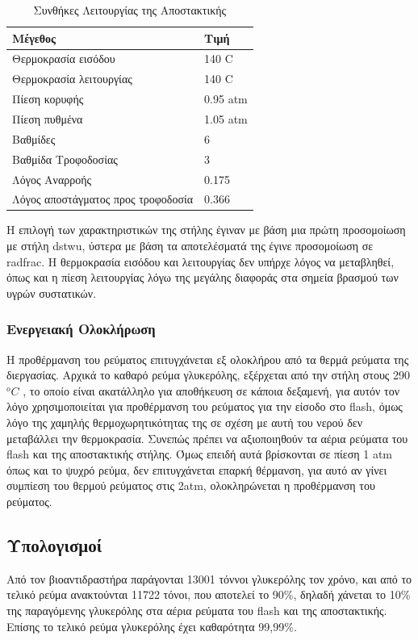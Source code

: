 \documentclass[11pt]{article}
\begin{document}
\begin{table}[htbp]
\caption{Συνθήκες Λειτουργίας της Αποστακτικής}
\centering
\begin{tabular}{ll}
Μέγεθος & Τιμή\\
\hline
Θερμοκρασία εισόδου & 140 C\\
Θερμοκρασία λειτουργίας & 140 C\\
Πίεση κορυφής & 0.95 atm\\
Πίεση πυθμένα & 1.05 atm\\
Βαθμίδες & 6\\
Βαθμίδα Τροφοδοσίας & 3\\
Λόγος Αναρροής & 0.175\\
Λόγος αποστάγματος προς τροφοδοσία & 0.366\\
\end{tabular}
\end{table}

Η επιλογή των χαρακτηριστικών της στήλης έγιναν με βάση μια πρώτη
προσομοίωση με στήλη dstwu, ύστερα με βάση τα αποτελέσματά της έγινε
προσομοίωση σε radfrac. Η θερμοκρασία εισόδου και λειτουργίας δεν υπήρχε
λόγος να μεταβληθεί, όπως και η πίεση λειτουργίας λόγω της μεγάλης
διαφοράς στα σημεία βρασμού των υγρών συστατικών.

\subsubsection{Ενεργειακή Ολοκλήρωση}
\label{sec:org3e814ba}
Η προθέρμανση του ρεύματος επιτυγχάνεται εξ ολοκλήρου από τα θερμά
ρεύματα της διεργασίας. Αρχικά το καθαρό ρεύμα γλυκερόλης, εξέρχεται
από την στήλη στους 290\(^{o} C\) , το οποίο είναι ακατάλληλο για
αποθήκευση σε κάποια δεξαμενή, για αυτόν τον λόγο χρησιμοποιείται για
προθέρμανση του ρεύματος για την είσοδο στο flash, όμως λόγο της χαμηλής
θερμοχωρητικότητας της σε σχέση με αυτή του νερού δεν μεταβάλλει την θερμοκρασία. Συνεπώς πρέπει
να αξιοποιηθούν τα αέρια ρεύματα του flash και της αποστακτικής στήλης.
Όμως επειδή αυτά βρίσκονται σε πίεση 1 atm όπως και το ψυχρό ρεύμα, δεν
επιτυγχάνεται επαρκή θέρμανση, για αυτό αν γίνει συμπίεση του θερμού
ρεύματος στις 2atm, ολοκληρώνεται η προθέρμανση του ρεύματος.

\subsection{Υπολογισμοί}
\label{sec:orgf402d32}
Από τον βιοαντιδραστήρα παράγονται 13001 τόννοι γλυκερόλης τον
χρόνο, και από το τελικό ρεύμα ανακτούνται 11722 τόνοι, που αποτελεί το
90\%, δηλαδή χάνεται το 10\% της παραγόμενης γλυκερόλης στα αέρια
ρεύματα του flash και της αποστακτικής. Επίσης το τελικό ρεύμα
γλυκερόλης έχει καθαρότητα 99,99\%.
\end{document}
